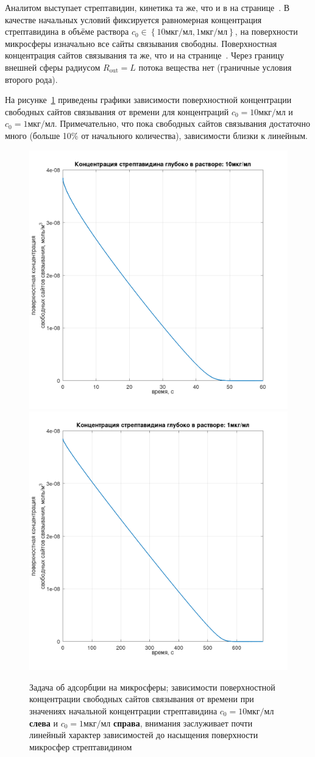 \documentclass[oneside,final,12pt]{extreport}
\begin{document}
Аналитом выступает стрептавидин, кинетика та же,
что и в на странице~\pageref{streptavidin_kinetics}.
В качестве начальных условий фиксируется равномерная концентрация
стрептавидина в объёме раствора
$c_0 \in \left\{10\text{мкг}/\text{мл}, 1\text{мкг}/\text{мл}\right\}$,
на поверхности микросферы изначально все сайты связывания свободны.
Поверхностная концентрация сайтов связывания та же,
что и на странице~\pageref{Gamma0.7}.
Через границу внешней сферы радиусом $R_\text{out} = L$ потока вещества нет
(граничные условия второго рода).

На рисунке~\ref{fig:sphere_stationary_probes}
приведены графики зависимости поверхностной концентрации
свободных сайтов связывания от времени для концентраций
$c_0 = 10\text{мкг}/\text{мл}$ и $c_0 = 1\text{мкг}/\text{мл}$.
Примечательно, что пока свободных сайтов связывания достаточно много
(больше 10\% от начального количества),
зависимости близки к линейным.


\begin{figure}[h]
  \centering
  \includegraphics[width=.5\textwidth]{pic/sphere_stationary_dil10_probe}%
  \includegraphics[width=.5\textwidth]{pic/sphere_stationary_dil100_probe}

  \caption{%
    \label{fig:sphere_stationary_probes}%
    Задача об адсорбции на микросферы;
    зависимости поверхностной концентрации свободных сайтов связывания
    от времени при значениях начальной концентрации стрептавидина
    $c_0 = 10\text{мкг}/\text{мл}$ \textbf{слева} и
    $c_0 = 1\text{мкг}/\text{мл}$ \textbf{справа},
    внимания заслуживает почти линейный характер зависимостей до
    насыщения поверхности микросфер стрептавидином
  }
\end{figure}
\end{document}
